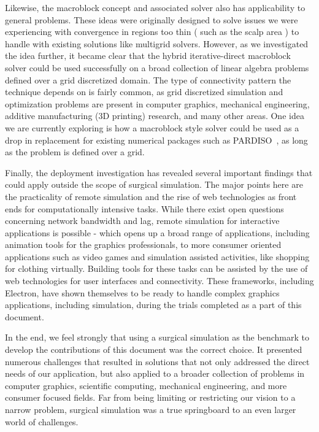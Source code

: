 Likewise, the macroblock concept and associated solver also has
applicability to general problems. These ideas were originally
designed to solve issues we were experiencing with convergence in
regions too thin ( such as the scalp area ) to handle with existing
solutions like multigrid solvers. However, as we investigated the idea
further, it became clear that the hybrid iterative-direct macroblock
solver could be used successfully on a broad collection of linear
algebra problems defined over a grid discretized domain. The type of
connectivity pattern the technique depends on is fairly common, as
grid discretized simulation and optimization problems are present in
computer graphics, mechanical engineering, additive manufacturing (3D
printing) research, and many other areas. One idea we are currently
exploring is how a macroblock style solver could be used as a drop in
replacement for existing numerical packages such as
PARDISO~\citep{pardiso-6.0a,pardiso-6.0b}, as long as the problem is
defined over a grid.

Finally, the deployment investigation has revealed several important
findings that could apply outside the scope of surgical
simulation. The major points here are the practicality of remote
simulation and the rise of web technologies as front ends for
computationally intensive tasks. While there exist open questions
concerning network bandwidth and lag, remote simulation for interactive
applications is possible - which opens up a broad range of
applications, including animation tools for the graphics
professionals, to more consumer oriented applications such as video
games and simulation assisted activities, like shopping for clothing
virtually. Building tools for these tasks can be assisted by the use
of web technologies for user interfaces and connectivity. These
frameworks, including Electron, have shown themselves to be ready to
handle complex graphics applications, including simulation, during the
trials completed as a part of this document.

In the end, we feel strongly that using a surgical simulation as the
benchmark to develop the contributions of this document was the
correct choice. It presented numerous challenges that resulted in
solutions that not only addressed the direct needs of our application,
but also applied to a broader collection of problems in computer
graphics, scientific computing, mechanical engineering, and more
consumer focused fields. Far from being limiting or restricting our
vision to a narrow problem, surgical simulation was a true springboard
to an even larger world of challenges.

